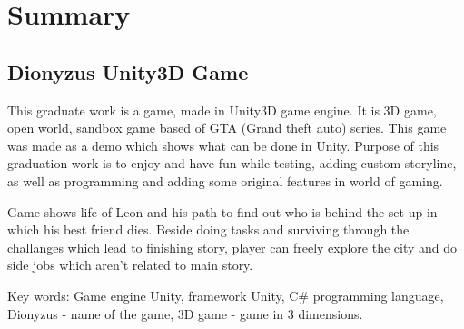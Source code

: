 \section*{Summary}
\subsection*{Dionyzus Unity3D Game}
This graduate work is a game, made in Unity3D game engine. It is 3D game, open world, sandbox game based of GTA  (Grand theft auto) series. This game was made as a demo which shows what can be done in Unity. Purpose of this graduation work is to enjoy and have fun while testing, adding custom storyline, as well as programming and adding some original features in world of gaming.

Game shows life of Leon and his path to find out who is behind the set-up in which his best friend dies. Beside doing tasks and surviving through the challanges which lead to finishing story, player can freely explore the city and do side jobs which aren't related to main story.

Key words: Game engine Unity, framework Unity, C\# programming language, Dionyzus - name of the game, 3D game - game in 3 dimensions.